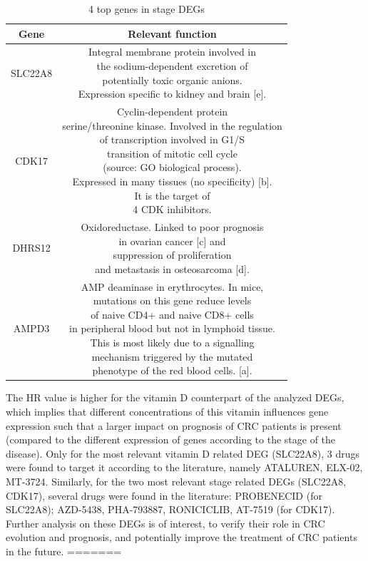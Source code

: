 \documentclass[fleqn,10pt]{SelfArx} %
\begin{document}
\begin{table}[ht]
	\small
	\centering
	\begin{tabular}{cc}
		\hline
		Gene & Relevant function\\
		\hline
		SLC22A8 & \makecell{Integral membrane protein involved in\\the sodium-dependent excretion of\\potentially toxic organic anions.\\Expression specific to kidney and brain [e].}\\
		CDK17 & \makecell{Cyclin-dependent protein \\serine/threonine kinase. Involved in the regulation \\of transcription involved in G1/S\\transition of mitotic cell cycle\\(source: GO biological process).\\Expressed in many tissues (no specificity) [b].\\It is the target of\\4 CDK inhibitors.}\\
		DHRS12 & \makecell{Oxidoreductase. Linked to poor prognosis\\in ovarian cancer [c] and\\suppression of proliferation\\and metastasis in osteosarcoma [d].}\\
		AMPD3 & \makecell{AMP deaminase in erythrocytes. In mice,\\mutations on this gene reduce levels\\of naive CD4+ and naive CD8+ cells\\in peripheral blood but not in lymphoid tissue.\\This is most likely due to a signalling\\mechanism triggered by the mutated\\phenotype of the red blood cells. [a].}\\
		\hline
	\end{tabular}
	\caption{4 top genes in stage DEGs}
	\label{tab:deg_char}
\end{table}
The HR value is higher for the vitamin D counterpart of the analyzed DEGs, which implies that different concentrations of this vitamin influences gene expression such that a larger impact on prognosis of CRC patients is present (compared to the different expression of genes according to the stage of the disease).
Only for the most relevant vitamin D related DEG (SLC22A8), 3 drugs were found to target it according to the literature, namely ATALUREN, ELX-02, MT-3724. Similarly, for the two most relevant stage related DEGs (SLC22A8, CDK17), several drugs were found in the literature: PROBENECID (for SLC22A8); AZD-5438, PHA-793887, RONICICLIB, AT-7519 (for CDK17). Further analysis on these DEGs is of interest, to verify their role in CRC evolution and prognosis, and potentially improve the treatment of CRC patients in the future.
=======
\end{document}
